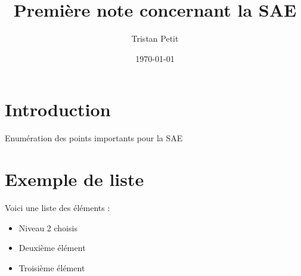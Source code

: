 \documentclass{article}
\begin{document}
\title{Première note concernant la SAE}
\author{Tristan Petit}
\date{\today}
\maketitle

\section{Introduction}
Enumération des points importants pour la SAE

\section{Exemple de liste}
Voici une liste des éléments :
\begin{itemize}
    \item Niveau 2 choisis
    \item Deuxième élément
    \item Troisième élément
\end{itemize}
\end{document}
